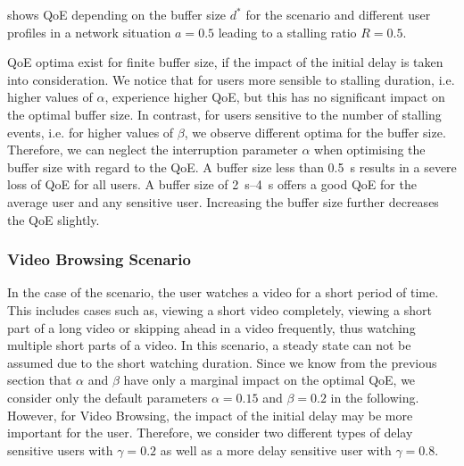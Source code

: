  shows \gls{QoE} depending on the buffer size \(d^*\) for the \watchNow scenario and different user profiles in a network situation \(a=0.5\) leading to a stalling ratio \(R=0.5\).

\gls{QoE} optima exist for finite buffer size, if the impact of the initial delay is taken into consideration. 
We notice that for users more sensible to stalling duration, i.e. higher values of \(\alpha\), experience higher \gls{QoE}, but this has no significant impact on the optimal buffer size.
In contrast, for users sensitive to the number of stalling events, i.e. for higher values of \(\beta\), we observe different optima for the buffer size.
Therefore, we can neglect the interruption parameter \(\alpha\) when optimising the buffer size with regard to the \gls{QoE}.
A buffer size less than \SI{0.5}{\second} results in a severe loss of \gls{QoE} for all users.
A buffer size of \SIrange{2}{4}{\second} offers a good \gls{QoE} for the average user and any sensitive user.
Increasing the buffer size further decreases the \gls{QoE} slightly.

\subsubsection*{Video Browsing Scenario}\label{sec:application:qoe_user_behaviour:typical_user_scenarios:browsing}

In the case of the \videoBrowsing scenario, the user watches a video for a short period of time. This includes cases such as, viewing a short video completely, viewing a short part of a long video or skipping ahead in a video frequently, thus watching multiple short parts of a video.
In this scenario, a steady state can not be assumed due to the short watching duration.
Since we know from the previous section that \(\alpha\) and \(\beta\) have only a marginal impact on the optimal \gls{QoE}, we consider only the default parameters \(\alpha=0.15\) and \(\beta=0.2\) in the following.
However, for Video Browsing, the impact of the initial delay may be more important for the user. Therefore, we consider two different types of delay sensitive users with \(\gamma=0.2\) as well as a more delay sensitive user with \(\gamma=0.8\).

